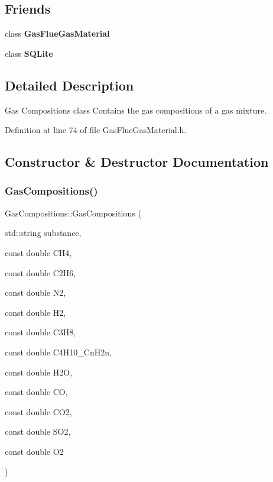 \subsection*{Friends}
\begin{DoxyCompactItemize}
\item 
\mbox{\label{class_gas_compositions_a766940ed13969e69611945f2d080c881}} 
class {\bfseries Gas\+Flue\+Gas\+Material}
\item 
\mbox{\label{class_gas_compositions_ac7d22f3ca36435f73d55df60dc799e14}} 
class {\bfseries S\+Q\+Lite}
\end{DoxyCompactItemize}


\subsection{Detailed Description}
Gas Compositions class Contains the gas compositions of a gas mixture. 

Definition at line 74 of file Gas\+Flue\+Gas\+Material.\+h.



\subsection{Constructor \& Destructor Documentation}
\mbox{\label{class_gas_compositions_ad0021d4285883374f8904f9465e41920}} 
\subsubsection{\texorpdfstring{Gas\+Compositions()}{GasCompositions()}}
{\footnotesize\ttfamily Gas\+Compositions\+::\+Gas\+Compositions (\begin{DoxyParamCaption}\item[{std\+::string}]{substance,  }\item[{const double}]{C\+H4,  }\item[{const double}]{C2\+H6,  }\item[{const double}]{N2,  }\item[{const double}]{H2,  }\item[{const double}]{C3\+H8,  }\item[{const double}]{C4\+H10\+\_\+\+Cn\+H2n,  }\item[{const double}]{H2O,  }\item[{const double}]{CO,  }\item[{const double}]{C\+O2,  }\item[{const double}]{S\+O2,  }\item[{const double}]{O2 }\end{DoxyParamCaption})\hspace{0.3cm}{\ttfamily [inline]}}

